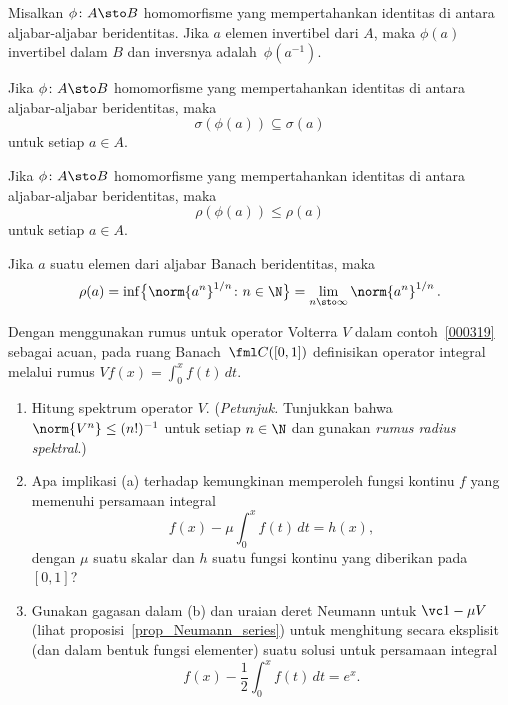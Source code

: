 \begin{prop} Misalkan $\phi\colon A \sto B$ homomorfisme yang mempertahankan identitas di antara aljabar-aljabar beridentitas. Jika $a$ elemen invertibel dari $A$,
maka $\phi(a)$ invertibel dalam $B$ dan inversnya adalah~$\phi(a^{-1})$.
\end{prop}

\begin{cor} Jika $\phi\colon A \sto B$ homomorfisme yang mempertahankan identitas di antara aljabar-aljabar beridentitas, maka
   \[ \sigma(\phi(a)) \subseteq \sigma(a) \]
untuk setiap $a \in A$.
\end{cor}

\begin{cor} Jika $\phi\colon A \sto B$ homomorfisme yang mempertahankan identitas di antara aljabar-aljabar beridentitas, maka
   \[ \rho(\phi(a)) \le \rho(a) \]
untuk setiap $a \in A$.
\end{cor}

\begin{thm}\label{C073157} Jika $a$ suatu elemen dari aljabar Banach
beridentitas, maka
   \[ \rho(a) = \inf\bigl\{\norm{a^n}^{1/n}\colon n \in \N\bigr\}
                                = \lim_{n \sto \infty} \norm{a^n}^{1/n}\,. \]
\end{thm}

\begin{exer} Dengan menggunakan rumus untuk operator Volterra $V$ dalam contoh~\ref{000319} sebagai
acuan, pada ruang Banach~$\fml C([0,1])$ definisikan operator integral melalui rumus $Vf(x)=\int_0^x f(t)\,dt$.
 \begin{enumerate}
  \item[(a)] Hitung spektrum operator $V$. (\emph{Petunjuk.} Tunjukkan bahwa $\norm{V^n}
\le (n!)^{-1}$ untuk setiap $n \in \N$ dan gunakan \emph{rumus radius spektral}.)
  \item[(b)] Apa implikasi (a) terhadap kemungkinan memperoleh fungsi kontinu $f$ yang
memenuhi persamaan integral
   \[ f(x) - \mu\int_0^xf(t)\,dt = h(x), \]
dengan $\mu$ suatu skalar dan $h$ suatu fungsi kontinu yang diberikan pada~$[0,1]$?
  \item[(c)] Gunakan gagasan dalam (b) dan uraian deret Neumann untuk $\vc 1 - \mu V$ (lihat
proposisi~\ref{prop_Neumann_series}) untuk menghitung secara eksplisit (dan dalam bentuk fungsi elementer)
suatu solusi untuk persamaan integral
 \[f(x) - {\textstyle \frac12}\int_0^xf(t)\,dt = e^x.\]
 \end{enumerate}
\end{exer}

